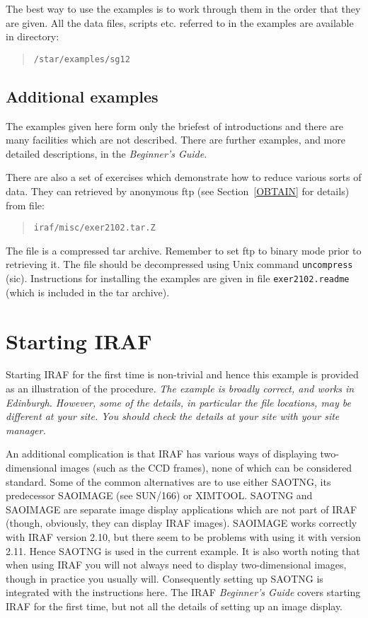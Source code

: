 \documentclass[twoside,11pt]{article}
\newcommand{\htmladdnormallink}[2]{#1}
\newcommand{\xref}[3]{#1}
\newcommand{\xlabel}[1]{}
\begin{document}
The best way to use the examples is to work through them in the order
that they are given.  All the data files, scripts etc. referred to in
the examples are available in directory:

\begin{quote}
{\tt /star/examples/sg12}
\end{quote}

\subsection{Additional examples}

The examples given here form only the briefest of introductions and
there are many facilities which are not described.  There are further
examples, and more detailed descriptions, in the {\it Beginner's
Guide}\/\cite{BARNES93}.

There are also a set of exercises which demonstrate how to reduce
various sorts of data.  They can retrieved by anonymous ftp (see
Section~\ref{OBTAIN} for details) from file:

\begin{quote}
{\tt iraf/misc/exer2102.tar.Z}
\end{quote}

The file is a compressed tar archive.  Remember to set ftp to binary
mode prior to retrieving it.  The file should be decompressed using Unix
command {\tt uncompress} (sic).  Instructions for installing the
examples are given in file 
\htmladdnormallink{{\tt exer2102.readme}}
{ftp://iraf.noao.edu/iraf/misc/exer2102.readme}
(which is included in the tar archive).


\newpage
\section{\xlabel{START}\label{START}Starting IRAF}

Starting IRAF for the first time is non-trivial and hence this example
is provided as an illustration of the procedure.  {\it The example is
broadly correct, and works in Edinburgh.  However, some of the details,
in particular the file locations, may be different at your site.  You
should check the details at your site with your site manager.}

An additional complication is that IRAF has various ways of displaying
two-dimensional images (such as the CCD frames), none of which can be
considered standard.  Some of the common alternatives are to use either
SAOTNG, its predecessor SAOIMAGE (see \xref{SUN/166}{sun166}{}\cite{SUN166})
or XIMTOOL.  SAOTNG and SAOIMAGE are separate image display applications
which are not part of IRAF (though, obviously, they can display IRAF images).
SAOIMAGE works correctly with IRAF version 2.10, but there seem to be
problems with using it with version 2.11.  Hence SAOTNG is used
in the current example.  It is also worth noting that when using IRAF you
will not always need to display two-dimensional images, though in practice
you usually will.  Consequently setting up SAOTNG is integrated with the
instructions here.  The IRAF {\it Beginner's Guide}\/\cite{BARNES93} covers
starting IRAF for the first time, but not all the details of setting up an
image display.
\end{document}
